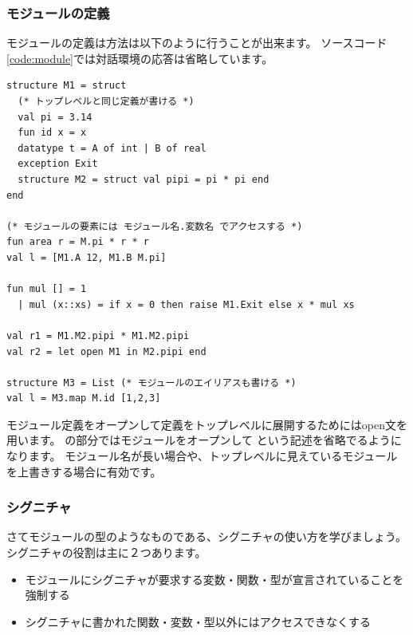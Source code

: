 \documentclass[11pt,a4paper]{jarticle}
\begin{document}
\subsubsection{モジュールの定義}

モジュールの定義は方法は以下のように行うことが出来ます。
ソースコード\ref{code:module}では対話環境の応答は省略しています。

\begin{lstlisting}[caption=モジュールの定義,label=code:module]
structure M1 = struct
  (* トップレベルと同じ定義が書ける *)
  val pi = 3.14
  fun id x = x
  datatype t = A of int | B of real
  exception Exit
  structure M2 = struct val pipi = pi * pi end
end

(* モジュールの要素には モジュール名.変数名 でアクセスする *)
fun area r = M.pi * r * r
val l = [M1.A 12, M1.B M.pi]

fun mul [] = 1
  | mul (x::xs) = if x = 0 then raise M1.Exit else x * mul xs

val r1 = M1.M2.pipi * M1.M2.pipi
val r2 = let open M1 in M2.pipi end

structure M3 = List (* モジュールのエイリアスも書ける *)
val l = M3.map M.id [1,2,3]
\end{lstlisting}

モジュール定義をオープンして定義をトップレベルに展開するためにはopen文を用います。
の部分ではモジュールをオープンして
という記述を省略でるようになります。
モジュール名が長い場合や、トップレベルに見えているモジュールを上書きする場合に有効です。



\subsubsection{シグニチャ}

さてモジュールの型のようなものである、シグニチャの使い方を学びましょう。
シグニチャの役割は主に２つあります。
\begin{itemize}
\item モジュールにシグニチャが要求する変数・関数・型が宣言されていることを強制する
\item シグニチャに書かれた関数・変数・型以外にはアクセスできなくする
\end{itemize}
\end{document}
